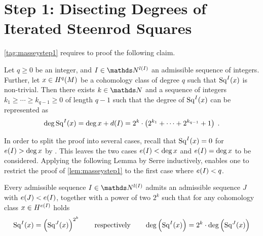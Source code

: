 \section{Step 1: Disecting Degrees of Iterated Steenrod Squares}%
\ref{tag:masseystep1} requires to proof the following claim.
\begin{Lem}[\ref{tag:masseystep1}]\label{lem:masseystep1}
  Let $q\geq 0$ be an integer,
  and $I\in\Nat^{\l(I)}$ an admissible sequence of integers.
  Further, let $x\in H^q(M)$ be a cohomology class of degree $q$
  such that $\mathrm{Sq}^{I}(x)$ is non-trivial.
  Then there exists $k\in\Nat$ and a sequence of integers
  $k_1\geq\dotsb\geq k_{q-1}\geq0$ of length $q-1$ such that the
  degree of $\mathrm{Sq}^{I}(x)$ can be represented as
  \begin{gather*}
    \deg \mathrm{Sq}^{I}(x)
    = \deg x + d(I)
    = 2^k\cdot
    \left( 2^{k_1}+\dotsb+2^{k_{q-1}} + 1 \right)
    \;.
  \end{gather*}
\end{Lem}

In order to split the proof into several cases, recall that
$\mathrm{Sq}^{I}(x) = 0$ for $e(I)>\deg x$ by
. This leaves the two cases
$e(I)<\deg x$ and $e(I)=\deg x$ to be considered.
Applying the following Lemma by Serre inductively, enables one to restrict the
proof of \autoref{lem:masseystep1} to the first case where $e(I)<q$.
\begin{Lem}[Serre] %
  \label{lem:serre}
  Every admissible sequence $I\in\Nat^{\l(I)}$ admits an admissible
  sequence $J$ with $e(J)<e(I)$,
  together with a power of two $2^k$
  such that for any cohomology class $x\in H^{e(I)}$ holds
  \begin{gather*}
    \mathrm{Sq}^{I}(x) = \left(\mathrm{Sq}^{J}(x)\right) ^{2^k}
    \qquad\text{respectively}\qquad
    \deg\left(\mathrm{Sq}^{I}(x)\right) = 2^k\cdot \deg\left(\mathrm{Sq}^{J}(x)\right)
  \end{gather*}
\end{Lem}

